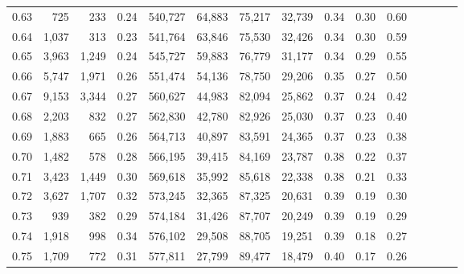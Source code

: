 \begin{tabular}{rrrcrrrrrrrrrrr}
0.63 &     725 &    233 &                                       0.24 &  540,727 &   64,883 &   75,217 &   32,739 &  0.34 &  0.30 &                         0.60 \\
0.64 &   1,037 &    313 &                                       0.23 &  541,764 &   63,846 &   75,530 &   32,426 &  0.34 &  0.30 &                         0.59 \\
0.65 &   3,963 &  1,249 &                                       0.24 &  545,727 &   59,883 &   76,779 &   31,177 &  0.34 &  0.29 &                         0.55 \\
0.66 &   5,747 &  1,971 &                                       0.26 &  551,474 &   54,136 &   78,750 &   29,206 &  0.35 &  0.27 &                         0.50 \\
0.67 &   9,153 &  3,344 &                                       0.27 &  560,627 &   44,983 &   82,094 &   25,862 &  0.37 &  0.24 &                         0.42 \\
0.68 &   2,203 &    832 &                                       0.27 &  562,830 &   42,780 &   82,926 &   25,030 &  0.37 &  0.23 &                         0.40 \\
0.69 &   1,883 &    665 &                                       0.26 &  564,713 &   40,897 &   83,591 &   24,365 &  0.37 &  0.23 &                         0.38 \\
0.70 &   1,482 &    578 &                                       0.28 &  566,195 &   39,415 &   84,169 &   23,787 &  0.38 &  0.22 &                         0.37 \\
0.71 &   3,423 &  1,449 &                                       0.30 &  569,618 &   35,992 &   85,618 &   22,338 &  0.38 &  0.21 &                         0.33 \\
0.72 &   3,627 &  1,707 &                                       0.32 &  573,245 &   32,365 &   87,325 &   20,631 &  0.39 &  0.19 &                         0.30 \\
0.73 &     939 &    382 &                                       0.29 &  574,184 &   31,426 &   87,707 &   20,249 &  0.39 &  0.19 &                         0.29 \\
0.74 &   1,918 &    998 &                                       0.34 &  576,102 &   29,508 &   88,705 &   19,251 &  0.39 &  0.18 &                         0.27 \\
0.75 &   1,709 &    772 &                                       0.31 &  577,811 &   27,799 &   89,477 &   18,479 &  0.40 &  0.17 &                         0.26 \\

\end{tabular}
